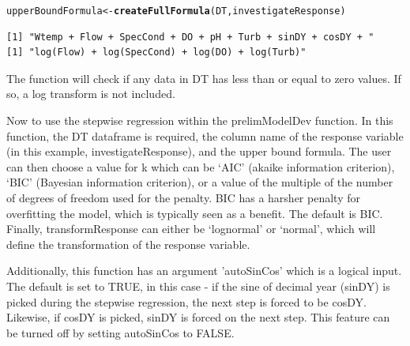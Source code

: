 \documentclass[a4paper,11pt]{article}\usepackage[]{graphicx}\usepackage[]{color}
\makeatletter
\newcommand{\hlstd}[1]{\textcolor[rgb]{0.345,0.345,0.345}{#1}}%
\newcommand{\hlkwb}[1]{\textcolor[rgb]{0.69,0.353,0.396}{#1}}%
\newcommand{\hlkwd}[1]{\textcolor[rgb]{0.737,0.353,0.396}{\textbf{#1}}}%
\newenvironment{kframe}{%
 \def\at@end@of@kframe{}%
 \ifinner\ifhmode%
  \def\at@end@of@kframe{\end{minipage}}%
  \begin{minipage}{\columnwidth}%
 \fi\fi%
 \def\FrameCommand##1{\hskip\@totalleftmargin \hskip-\fboxsep
 \colorbox{shadecolor}{##1}\hskip-\fboxsep
     \hskip-\linewidth \hskip-\@totalleftmargin \hskip\columnwidth}%
 \MakeFramed {\advance\hsize-\width
   \@totalleftmargin\z@ \linewidth\hsize
   \@setminipage}}%
 {\par\unskip\endMakeFramed%
 \at@end@of@kframe}
\newenvironment{knitrout}{}{} %
\makeatother
\begin{document}
\begin{knitrout}
\color{fgcolor}\begin{kframe}
\begin{alltt}
\hlstd{upperBoundFormula} \hlkwb{<-} \hlkwd{createFullFormula}\hlstd{(DT,investigateResponse)}
\end{alltt}
\end{kframe}
\end{knitrout}


\begin{knitrout}
\color{fgcolor}\begin{kframe}
\begin{verbatim}
[1] "Wtemp + Flow + SpecCond + DO + pH + Turb + sinDY + cosDY + "
[1] "log(Flow) + log(SpecCond) + log(DO) + log(Turb)"
\end{verbatim}
\end{kframe}
\end{knitrout}


The function will check if any data in DT has less than or equal to zero values. If so, a log transform is not included.

Now to use the stepwise regression within the prelimModelDev function. In this function, the DT dataframe is required, the column name of the response variable (in this example, investigateResponse), and the upper bound formula. The user can then choose a value for k which can be `AIC' (akaike information criterion), `BIC' (Bayesian information criterion), or a value of the multiple of the number of degrees of freedom used for the penalty. BIC has a harsher penalty for overfitting the model, which is typically seen as a benefit. The default is BIC. Finally, transformResponse can either be `lognormal' or `normal', which will define the transformation of the response variable. 

Additionally, this function has an argument 'autoSinCos' which is a logical input. The default is set to TRUE, in this case - if the sine of decimal year (sinDY) is picked during the stepwise regression, the next step is forced to be cosDY. Likewise, if cosDY is picked, sinDY is forced on the next step. This feature can be turned off by setting autoSinCos to FALSE.
\end{document}
